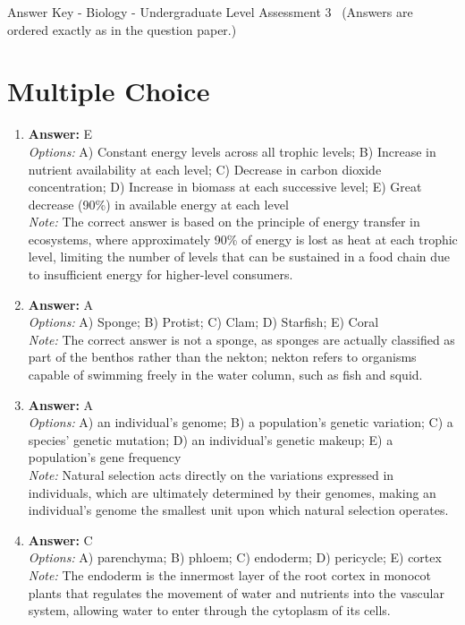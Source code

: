 \documentclass[12pt]{article}
\begin{document}
\begin{center}
Answer Key - Biology - Undergraduate Level Assessment 3 \
\small (Answers are ordered exactly as in the question paper.)
\end{center}

\section*{Multiple Choice}
\begin{enumerate}[label=\arabic*.]
\item \textbf{Answer:} E
\\ \textit{Options:} A) Constant energy levels across all trophic levels; B) Increase in nutrient availability at each level; C) Decrease in carbon dioxide concentration; D) Increase in biomass at each successive level; E) Great decrease (90\%) in available energy at each level
\\ \textit{Note:} The correct answer is based on the principle of energy transfer in ecosystems, where approximately 90\% of energy is lost as heat at each trophic level, limiting the number of levels that can be sustained in a food chain due to insufficient energy for higher-level consumers.
\item \textbf{Answer:} A
\\ \textit{Options:} A) Sponge; B) Protist; C) Clam; D) Starfish; E) Coral
\\ \textit{Note:} The correct answer is not a sponge, as sponges are actually classified as part of the benthos rather than the nekton; nekton refers to organisms capable of swimming freely in the water column, such as fish and squid.
\item \textbf{Answer:} A
\\ \textit{Options:} A) an individual's genome; B) a population's genetic variation; C) a species' genetic mutation; D) an individual's genetic makeup; E) a population's gene frequency
\\ \textit{Note:} Natural selection acts directly on the variations expressed in individuals, which are ultimately determined by their genomes, making an individual's genome the smallest unit upon which natural selection operates.
\item \textbf{Answer:} C
\\ \textit{Options:} A) parenchyma; B) phloem; C) endoderm; D) pericycle; E) cortex
\\ \textit{Note:} The endoderm is the innermost layer of the root cortex in monocot plants that regulates the movement of water and nutrients into the vascular system, allowing water to enter through the cytoplasm of its cells.

\end{enumerate}
\end{document}
